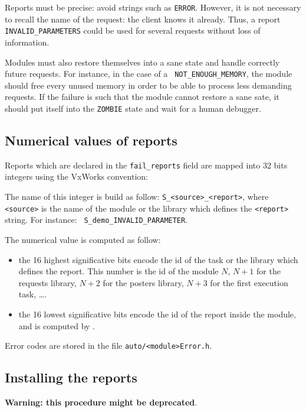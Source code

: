Reports must be precise:  avoid strings such  as {\tt ERROR}. However, it
is not necessary to recall the name  of the request:  the client knows it
already.  Thus, a  report {\tt  INVALID\_PARAMETERS}   could be used  for
several requests without loss of information.

Modules must  also   restore  themselves into  a  sane  state  and handle
correctly future   requests.   For  instance, in  the   case  of  a  {\tt
NOT\_ENOUGH\_MEMORY}, the module should free every unused memory in order
to be able to process  less demanding requests.  If  the failure is  such
that the module cannot restore a sane sate, it should put itself into the
{\tt ZOMBIE} state and wait for a human debugger.


\subsection{Numerical values of reports}

Reports which  are declared in the {\tt  fail\_reports} field are mapped into
32 bits integers using the VxWorks convention:

The name of this integer is build as follow: {\tt S\_<source>\_<report>},
where {\tt <source>} is the name of the module or the library which defines
the      {\tt       <report>}     string.    For       instance:     {\tt
S\_demo\_INVALID\_PARAMETER}.

The numerical value is computed as follow:
\begin{itemize}
\item the 16 highest significative bits encode the id of the task or
the  library which  defines the report.   This  number is  the  id of the
module  $N$, $N+1$   for  the requests  library, $N+2$  for   the posters
library, $N+3$ for the first execution task, \ldots.

\item the 16 lowest significative bits encode the id of the report
inside the module, and is computed by \GenoM.
\end{itemize}

Error codes are stored in the file {\tt auto/<module>Error.h}.


\subsection{Installing the reports}

{\bf Warning: this procedure might be deprecated}.

